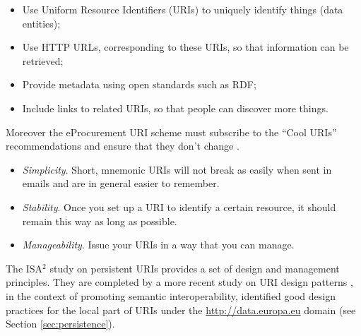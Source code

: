 	\begin{itemize}
		\item Use Uniform Resource Identifiers (URIs) to uniquely identify
		things (data entities);
		\item Use HTTP URLs, corresponding to these URIs, so that
		information can be retrieved;
		\item Provide metadata using open standards such as RDF;
		\item Include links to related URIs, so that people can discover more
		things.		
	\end{itemize} 
	
	Moreover the eProcurement URI scheme must subscribe to the ``Cool URIs'' recommendations \cite{cool-uri-cyganiak} and ensure that they don't change \cite{burners1998cool}. 
	
	\begin{itemize}
		\item \textit{Simplicity}. Short, mnemonic URIs will not break as easily when sent in emails and are in general easier to remember.
		\item \textit{Stability}. Once you set up a URI to identify a certain resource, it should remain this way as long as possible.
		\item  \textit{Manageability}. Issue your URIs in a way that you can manage. \cite{cool-uri-cyganiak}
	\end{itemize}

	The ISA$^2$ study on persistent URIs \cite{d7.1.3-2012} provides a set of design and management principles. They are completed by a more recent study on URI design patterns \citep{d4.02.02-2018}, in the context of promoting semantic interoperability, identified good design practices for the local part of URIs under the \url{http://data.europa.eu} domain (see Section \ref{sec:persistence}).
	
